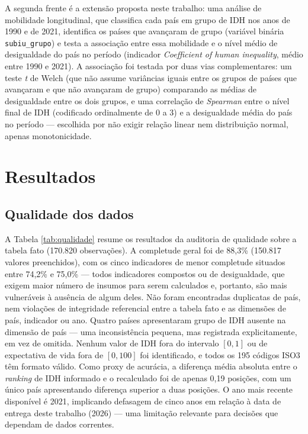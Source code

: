 \documentclass[11pt,a4paper]{article}
\begin{document}
A segunda frente é a extensão proposta neste trabalho: uma análise de mobilidade longitudinal, que classifica cada país em grupo de IDH nos anos de 1990 e de 2021, identifica os países que avançaram de grupo (variável binária \texttt{subiu\_grupo}) e testa a associação entre essa mobilidade e o nível médio de desigualdade do país no período (indicador \textit{Coefficient of human inequality}, médio entre 1990 e 2021). A associação foi testada por duas vias complementares: um teste \textit{t} de Welch (que não assume variâncias iguais entre os grupos de países que avançaram e que não avançaram de grupo) comparando as médias de desigualdade entre os dois grupos, e uma correlação de \textit{Spearman} entre o nível final de IDH (codificado ordinalmente de 0 a 3) e a desigualdade média do país no período --- escolhida por não exigir relação linear nem distribuição normal, apenas monotonicidade.

\section{Resultados}

\subsection{Qualidade dos dados}

A Tabela \ref{tab:qualidade} resume os resultados da auditoria de qualidade sobre a tabela fato (170.820 observações). A completude geral foi de 88,3\% (150.817 valores preenchidos), com os cinco indicadores de menor completude situados entre 74,2\% e 75,0\% --- todos indicadores compostos ou de desigualdade, que exigem maior número de insumos para serem calculados e, portanto, são mais vulneráveis à ausência de algum deles. Não foram encontradas duplicatas de país, nem violações de integridade referencial entre a tabela fato e as dimensões de país, indicador ou ano. Quatro países apresentaram grupo de IDH ausente na dimensão de país --- uma inconsistência pequena, mas registrada explicitamente, em vez de omitida. Nenhum valor de IDH fora do intervalo $[0,1]$ ou de expectativa de vida fora de $[0,100]$ foi identificado, e todos os 195 códigos ISO3 têm formato válido. Como proxy de acurácia, a diferença média absoluta entre o \textit{ranking} de IDH informado e o recalculado foi de apenas 0,19 posições, com um único país apresentando diferença superior a duas posições. O ano mais recente disponível é 2021, implicando defasagem de cinco anos em relação à data de entrega deste trabalho (2026) --- uma limitação relevante para decisões que dependam de dados correntes.
\end{document}
